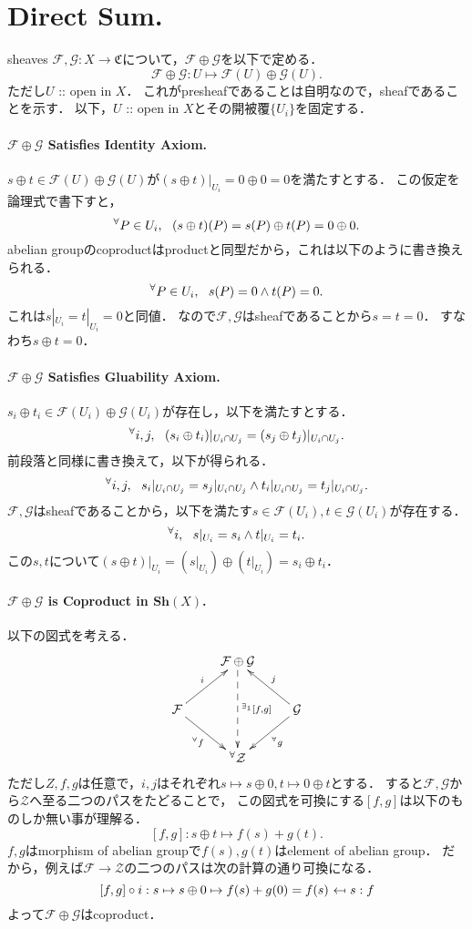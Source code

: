 \documentclass[a4paper]{jsarticle}
\newcommand{\shF}{\mathcal{F}}
\newcommand{\shG}{\mathcal{G}}
\newcommand{\Sh}{\mathbf{Sh}}
\begin{document}
\section{Direct Sum.} %
    sheaves $\shF,\shG: X \to \mathfrak{C}$について，$\shF \oplus \shG$を以下で定める．
    \[ \shF \oplus \shG: U \mapsto \shF(U) \oplus \shG(U). \]
    ただし$U$ :: open in $X$．
    これがpresheafであることは自明なので，sheafであることを示す．
    以下，$U$ :: open in $X$とその開被覆$\{U_i\}$を固定する．

    \paragraph{$\shF \oplus \shG$ Satisfies Identity Axiom.}
    $s \oplus t \in \shF(U) \oplus \shG(U)$が$(s \oplus t)|_{U_i}=0 \oplus 0=0$を満たすとする．
    この仮定を論理式で書下すと，
    \[ {}^{\forall} P \in U_i,~~ (s \oplus t)(P)=s(P) \oplus t(P)=0 \oplus 0. \]
    abelian groupのcoproductはproductと同型だから，これは以下のように書き換えられる．
    \[ {}^{\forall} P \in U_i,~~ s(P)=0 \land t(P)=0. \]
    これは$s|_{U_i}=t|_{U_i}=0$と同値．
    なので$\shF,\shG$はsheafであることから$s=t=0$．
    すなわち$s \oplus t=0$．

    \paragraph{$\shF \oplus \shG$ Satisfies Gluability Axiom.}
    $s_i \oplus t_i \in \shF(U_i) \oplus \shG(U_i)$が存在し，以下を満たすとする．
    \[ {}^{\forall} i,j,~~ (s_i \oplus t_i)|_{U_i \cap U_j}=(s_j \oplus t_j)|_{U_i \cap U_j}. \]
    前段落と同様に書き換えて，以下が得られる．
    \[ {}^{\forall} i,j,~~ s_i|_{U_i \cap U_j}=s_j|_{U_i \cap U_j} \land t_i|_{U_i \cap U_j}=t_j|_{U_i \cap U_j}. \]
    $\shF,\shG$はsheafであることから，以下を満たす$s \in \shF(U_i),t \in \shG(U_i)$が存在する．
    \[ {}^{\forall} i,~~ s|_{U_i}=s_i \land t|_{U_i}=t_i. \]
    この$s,t$について$(s \oplus t)|_{U_i}=(s|_{U_i}) \oplus (t|_{U_i})=s_i \oplus t_i$．

    \paragraph{$\shF \oplus \shG$ is Coproduct in $\Sh(X)$.}
    以下の図式を考える．
    \[
    \xymatrix
    {
        {} & \shF \oplus \shG \ar@{-->}[dd]^-{{}^{\exists_1} [f,g]}& {} \\
        \shF \ar[rd]_-{{}^\forall f} \ar[ru]^-{i}& {} & \shG \ar[ld]^-{{}^\forall g} \ar[lu]_-{j}\\
        {} & {}^\forall \mathcal{Z} & {}
    }
    \]
    ただし$Z,f,g$は任意で，$i, j$はそれぞれ$s \mapsto s \oplus 0, t \mapsto 0 \oplus t$とする．
    すると$\shF, \shG$から$\mathcal{Z}$へ至る二つのパスをたどることで，
    この図式を可換にする$[f,g]$は以下のものしか無い事が理解る．
    \[ [f,g]: s \oplus t \mapsto f(s)+g(t). \]
    $f,g$はmorphism of abelian groupで$f(s),g(t)$はelement of abelian group．
    だから，例えば$\shF \to \mathcal{Z}$の二つのパスは次の計算の通り可換になる．
    \[ [f,g] \circ i : s \mapsto s \oplus 0 \mapsto f(s)+g(0)=f(s) ~\mapedfrom~ s: f \]
    よって$\shF \oplus \shG$はcoproduct．
\end{document}

